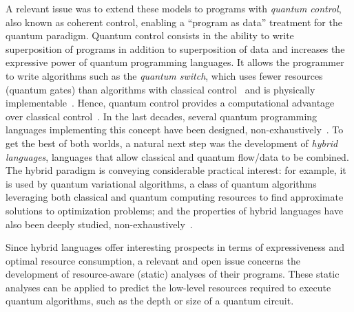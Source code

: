 \documentclass[10pt,a4paper]{article}
\newcommand{\ie}{\text{i.e., }}
\begin{document}
A relevant issue was to extend these models to programs with \emph{quantum
control}, also known as coherent control, enabling a ``program as data''
treatment for the quantum paradigm. Quantum control consists in the ability to
write superposition of programs in addition to superposition of data and
increases the expressive power of quantum programming languages. It allows the
programmer to write algorithms such as the \emph{quantum switch}, which uses
fewer resources (quantum gates) than algorithms with classical
control~\cite{CAPV13} and is physically implementable~\cite{AWHM20,PMA+15}.
Hence, quantum control provides a computational advantage over classical
control~\cite{ACB14,TCM+21,KOY24}. In the last decades, several  quantum
programming languages implementing this concept have been designed,
non-exhaustively~\cite{AG05,SVV18,DCM22,Lem24, YVC24}. To get the best of both worlds,
a natural next step was the development of \emph{hybrid languages}, \ie
languages that allow classical and quantum flow/data to be combined.
The hybrid paradigm is conveying considerable practical interest: for example,
it is used by quantum variational algorithms, a class of quantum algorithms
leveraging both classical and quantum computing resources to find approximate
solutions to optimization problems; and the properties of hybrid languages have
also been deeply studied, non-exhaustively~\cite{Qunity23,Yin24,DLPZ25,BPP25}.

Since hybrid languages offer interesting prospects in terms of expressiveness
and optimal resource consumption, a relevant and open issue concerns the
development of resource-aware (static) analyses of their programs. These static
analyses can be applied to predict the low-level resources required to execute
quantum algorithms, such as the depth or size of a quantum circuit.
\end{document}
